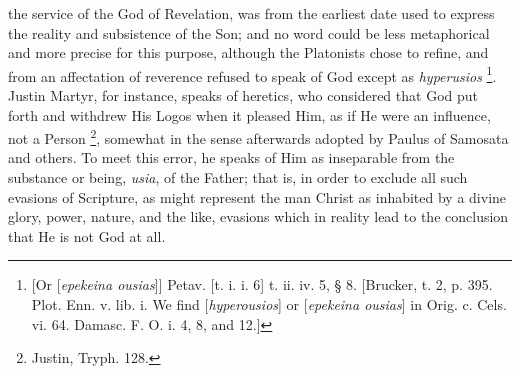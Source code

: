 the service of the God of Revelation, was from the earliest date used
to express the reality and subsistence of the Son; and no word could
be less metaphorical and more precise for this purpose, although the
Platonists chose to refine, and from an affectation of reverence
refused to speak of God except as \emph{hyperusios} \footnote{[Or [\emph{epekeina ousias}]] Petav. [t. i.
i. 6] t. ii. iv. 5, § 8. [Brucker, t. 2, p. 395. Plot. Enn. v. lib. i.
We find [\emph{hyperousios}] or [\emph{epekeina ousias}] in Orig. c.
Cels. vi. 64. Damasc. F. O. i. 4, 8, and 12.]}. Justin Martyr, for instance, speaks of heretics, who
considered that God put forth and withdrew His Logos when it pleased
Him, as if He were an influence, not a Person \footnote{Justin, Tryph. 128.}, somewhat in the sense afterwards adopted by Paulus of
Samosata and others. To meet this error, he speaks of Him as
inseparable from the substance or being, \emph{usia}, of the Father;
that is, in order to exclude all such evasions of Scripture, as might
represent the man Christ as inhabited by a divine glory, power,
nature, and the like, evasions which in reality lead to the conclusion
that He is not God at all.

